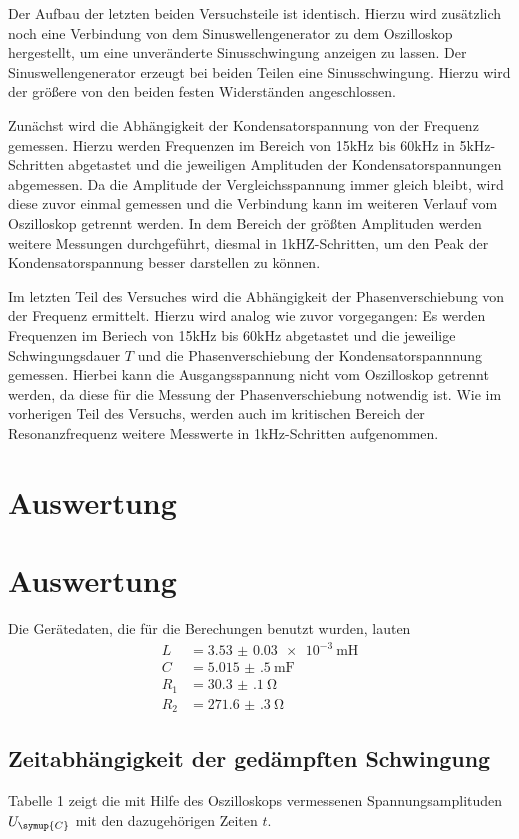 Der Aufbau der letzten beiden Versuchsteile ist identisch. Hierzu wird zusätzlich noch eine Verbindung von dem Sinuswellengenerator
zu dem Oszilloskop hergestellt, um eine unveränderte Sinusschwingung anzeigen zu lassen. Der Sinuswellengenerator erzeugt
bei beiden Teilen eine Sinusschwingung. Hierzu wird der größere von den beiden festen Widerständen angeschlossen.

Zunächst wird die Abhängigkeit der Kondensatorspannung von der Frequenz gemessen. Hierzu werden Frequenzen im Bereich
von 15kHz bis 60kHz in 5kHz-Schritten abgetastet und die jeweiligen Amplituden der Kondensatorspannungen abgemessen.
Da die Amplitude der Vergleichsspannung immer gleich bleibt, wird diese zuvor einmal gemessen und die Verbindung
kann im weiteren Verlauf vom Oszilloskop getrennt werden.
In dem Bereich der größten Amplituden werden weitere Messungen durchgeführt, diesmal in 1kHZ-Schritten, um den Peak
der Kondensatorspannung besser darstellen zu können.

Im letzten Teil des Versuches wird die Abhängigkeit der Phasenverschiebung von der Frequenz ermittelt.
Hierzu wird analog wie zuvor vorgegangen: Es werden Frequenzen im Beriech von 15kHz bis 60kHz abgetastet und die jeweilige
Schwingungsdauer $T$ und die Phasenverschiebung der Kondensatorspannnung gemessen. Hierbei kann die Ausgangsspannung nicht
vom Oszilloskop getrennt werden, da diese für die Messung der Phasenverschiebung notwendig ist. Wie im vorherigen Teil
des Versuchs, werden auch im kritischen Bereich der Resonanzfrequenz weitere Messwerte in 1kHz-Schritten aufgenommen.

\section{Auswertung}
\section{Auswertung}

Die Gerätedaten, die für die Berechungen benutzt wurden, lauten
\begin{align*}
  L & = \SI{3.53(3)e-3}{\milli\henry} \\
  C & = \SI{5.015(500)}{\milli\farad} \\
  R_1 & = \SI{30.3(1)}{\ohm} \\
  R_2 & = \SI{271.6(3)}{\ohm}
\end{align*}

\subsection{Zeitabhängigkeit der gedämpften Schwingung}
Tabelle 1 zeigt die mit Hilfe des Oszilloskops vermessenen Spannungsamplituden $U_\symup{C}$ mit den dazugehörigen
Zeiten $t$.

